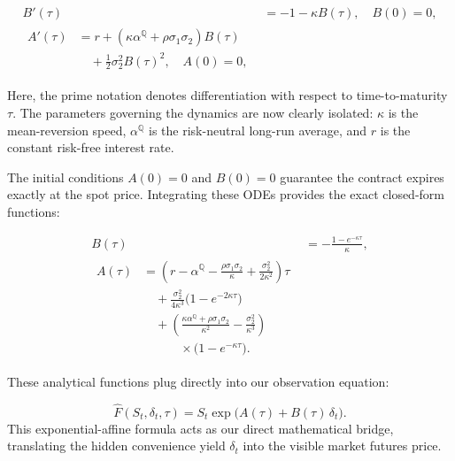 \documentclass[sigconf, authorversion=true, nonacm=true]{acmart}
\newcommand{\convyield}{\delta}             %
\begin{document}
\begin{align}
  \label{eq:gs_ode_B}
  B'(\tau) &= -1 - \kappa B(\tau), \quad B(0) = 0, \\
  \label{eq:gs_ode_A}
  \begin{split}
  A'(\tau) &= r + \left(\kappa\alpha^{\mathbb{Q}} + \rho\sigma_1\sigma_2\right)B(\tau) \\
           &\quad + \frac{1}{2}\sigma_2^2 B(\tau)^2, \quad A(0) = 0,
  \end{split}
\end{align}

Here, the prime notation denotes differentiation with respect to time-to-maturity $\tau$. The parameters governing the dynamics are now clearly isolated: $\kappa$ is the mean-reversion speed, $\alpha^{\mathbb{Q}}$ is the risk-neutral long-run average, and $r$ is the constant risk-free interest rate. 

The initial conditions $A(0)=0$ and $B(0)=0$ guarantee the contract expires exactly at the spot price. Integrating these ODEs provides the exact closed-form functions:

\begin{align}
  \label{eq:gs_B_sol}
  B(\tau) &= -\frac{1 - e^{-\kappa\tau}}{\kappa}, \\
  \label{eq:gs_A_sol}
  \begin{split}
  A(\tau) &= \left(r - \alpha^{\mathbb{Q}} - \frac{\rho\sigma_1\sigma_2}{\kappa} + \frac{\sigma_2^2}{2\kappa^2}\right)\tau \\
          &\quad + \frac{\sigma_2^2}{4\kappa^3}\big(1 - e^{-2\kappa\tau}\big) \\
          &\quad + \left(\frac{\kappa\alpha^{\mathbb{Q}} + \rho\sigma_1\sigma_2}{\kappa^2} - \frac{\sigma_2^2}{\kappa^3}\right) \\
          &\qquad\quad \times \big(1 - e^{-\kappa\tau}\big).
  \end{split}
\end{align}

These analytical functions plug directly into our observation equation:

\begin{equation}
  \label{eq:gs_futures}
  \hat{F}(S_t, \convyield_t, \tau) = S_t \exp\!\big(
    A(\tau) + B(\tau)\,\convyield_t
  \big).
\end{equation}
\noindent
This exponential-affine formula acts as our direct mathematical bridge, translating the hidden convenience yield $\convyield_t$ into the visible market futures price.
\end{document}
